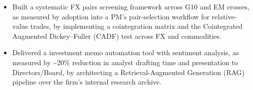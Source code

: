 \documentclass{article}
\begin{document}
\entrygap
{}
\begin{itemize}
  \item Built a systematic FX pairs screening framework across G10 and EM crosses, as measured by adoption into a PM's pair-selection workflow for relative-value trades, by implementing a cointegration matrix and the Cointegrated Augmented Dickey--Fuller (CADF) test across FX and commodities.
  \item Delivered a  investment memo automation tool with sentiment analysis, as measured by \textasciitilde{}20\% reduction in analyst drafting time and presentation to Directors/Board, by architecting a Retrieval-Augmented Generation (RAG) pipeline over the firm's internal research archive.
\end{itemize}

\cvpublications

\begin{cvskills}
\end{cvskills}
\end{document}

